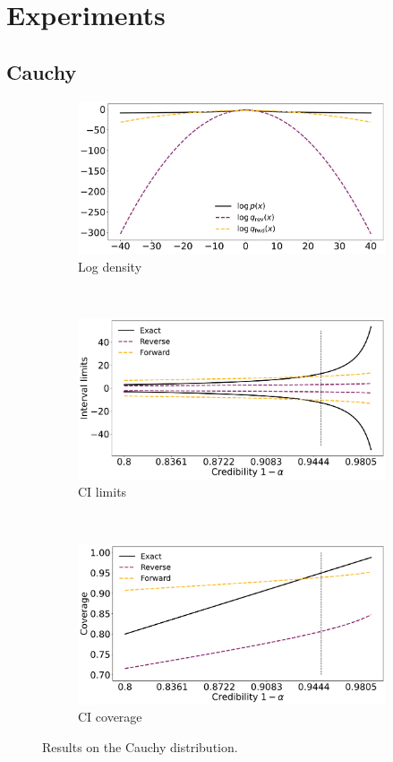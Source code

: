 \section{Experiments}


\subsection{Cauchy}

\begin{figure}[ht]
    \begin{subfigure}{\linewidth}
    \centering
    \includegraphics[width=0.8\linewidth]{fig/cauchy_logq.pdf}
    \caption{Log density}
    \label{fig:cauchy_lp}
    \end{subfigure}\\[1ex]
    \begin{subfigure}{\linewidth}
    \centering
    \includegraphics[width=0.8\linewidth]{fig/cauchy_cilims.pdf}
    \caption{CI limits}
    \label{fig:cauchy_lims}
    \end{subfigure}\\[1ex]
    \begin{subfigure}{\linewidth}
    \centering
    \includegraphics[width=0.8\linewidth]{fig/cauchy_cicoverage.pdf}
    \caption{CI coverage}
    \label{fig:cauchy_coverage}
    \end{subfigure}
    \caption{Results on the Cauchy distribution.}
    \label{fig:cauchy}
\end{figure}



